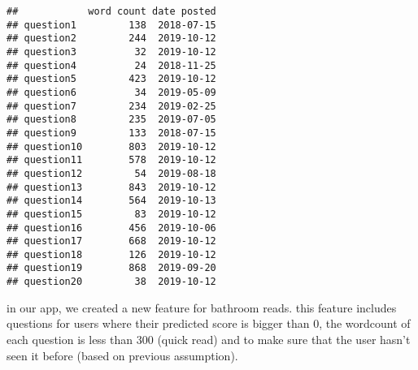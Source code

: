 \documentclass[]{article}
\newenvironment{Shaded}{\begin{snugshade}}{\end{snugshade}}
\newcommand{\ControlFlowTok}[1]{\textcolor[rgb]{0.13,0.29,0.53}{\textbf{#1}}}
\newcommand{\DecValTok}[1]{\textcolor[rgb]{0.00,0.00,0.81}{#1}}
\newcommand{\FloatTok}[1]{\textcolor[rgb]{0.00,0.00,0.81}{#1}}
\newcommand{\KeywordTok}[1]{\textcolor[rgb]{0.13,0.29,0.53}{\textbf{#1}}}
\newcommand{\NormalTok}[1]{#1}
\newcommand{\OperatorTok}[1]{\textcolor[rgb]{0.81,0.36,0.00}{\textbf{#1}}}
\newcommand{\OtherTok}[1]{\textcolor[rgb]{0.56,0.35,0.01}{#1}}
\newcommand{\StringTok}[1]{\textcolor[rgb]{0.31,0.60,0.02}{#1}}
\begin{document}
\begin{verbatim}
##            word count date posted
## question1         138  2018-07-15
## question2         244  2019-10-12
## question3          32  2019-10-12
## question4          24  2018-11-25
## question5         423  2019-10-12
## question6          34  2019-05-09
## question7         234  2019-02-25
## question8         235  2019-07-05
## question9         133  2018-07-15
## question10        803  2019-10-12
## question11        578  2019-10-12
## question12         54  2019-08-18
## question13        843  2019-10-12
## question14        564  2019-10-13
## question15         83  2019-10-12
## question16        456  2019-10-06
## question17        668  2019-10-12
## question18        126  2019-10-12
## question19        868  2019-09-20
## question20         38  2019-10-12
\end{verbatim}

in our app, we created a new feature for bathroom reads. this feature
includes questions for users where their predicted score is bigger than
0, the wordcount of each question is less than 300 (quick read) and to
make sure that the user hasn't seen it before (based on previous
assumption).

\begin{Shaded}
\end{Shaded}
\end{document}
